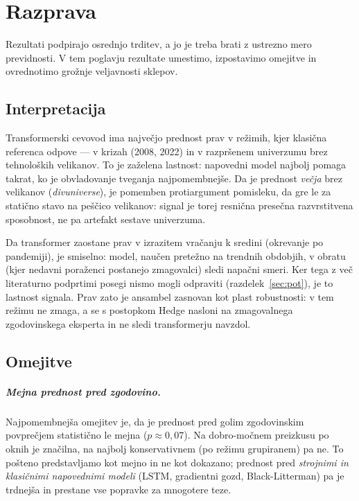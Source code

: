\chapter{Razprava}
\label{ch:razprava}

Rezultati podpirajo osrednjo trditev, a jo je treba brati z ustrezno mero previdnosti. V tem poglavju rezultate umestimo, izpostavimo omejitve in ovrednotimo grožnje veljavnosti sklepov.

\section{Interpretacija}
\label{sec:interpretacija}

Transformerski cevovod ima največjo prednost prav v režimih, kjer klasična referenca odpove --- v krizah (2008, 2022) in v razpršenem univerzumu brez tehnoloških velikanov. To je zaželena lastnost: napovedni model najbolj pomaga takrat, ko je obvladovanje tveganja najpomembnejše. Da je prednost \emph{večja} brez velikanov (\emph{divuniverse}), je pomemben protiargument pomisleku, da gre le za statično stavo na peščico velikanov: signal je torej resnična presečna razvrstitvena sposobnost, ne pa artefakt sestave univerzuma.

Da transformer zaostane prav v izrazitem vračanju k sredini (okrevanje po pandemiji), je smiselno: model, naučen pretežno na trendnih obdobjih, v obratu (kjer nedavni poraženci postanejo zmagovalci) sledi napačni smeri. Ker tega z več literaturno podprtimi posegi nismo mogli odpraviti (razdelek~\ref{sec:pot}), je to lastnost signala. Prav zato je ansambel zasnovan kot plast robustnosti: v tem režimu ne zmaga, a se s postopkom Hedge nasloni na zmagovalnega zgodovinskega eksperta in ne sledi transformerju navzdol.

\section{Omejitve}
\label{sec:omejitve}

\paragraph{Mejna prednost pred zgodovino.} Najpomembnejša omejitev je, da je prednost pred golim zgodovinskim povprečjem statistično le mejna ($p\approx 0{,}07$). Na dobro-močnem preizkusu po oknih je značilna, na najbolj konservativnem (po režimu grupiranem) pa ne. To pošteno predstavljamo kot mejno in ne kot dokazano; prednost pred \emph{strojnimi in klasičnimi napovednimi modeli} (LSTM, gradientni gozd, Black-Litterman) pa je trdnejša in prestane vse popravke za mnogotere teze.

